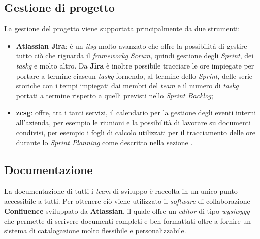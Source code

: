 \newpage

\subsection{Gestione di progetto}
    La gestione del progetto viene supportata principalmente da due strumenti:
    \begin{itemize}
        \item \textbf{Atlassian Jira}: è un \textit{\gls{itsg}} molto avanzato che offre la possibilità di gestire tutto ciò che riguarda il \textit{\gls{frameworkg}} \textit{Scrum}, quindi gestione degli \textit{Sprint}, dei \textit{\gls{taskg}} e molto altro. Da \textbf{Jira} è inoltre possibile tracciare le ore impiegate per portare a termine ciascun \textit{\gls{taskg}} fornendo, al termine dello \textit{Sprint}, delle serie storiche con i tempi impiegati dai membri del \textit{team} e il numero di \textit{\gls{taskg}} portati a termine rispetto a quelli previsti nello \textit{Sprint Backlog}; 
        \item \textbf{\gls{zcsg}}: offre, tra i tanti servizi, il calendario per la gestione degli eventi interni all'azienda, per esempio le riunioni e la possibilità di lavorare su documenti condivisi, per esempio i fogli di calcolo utilizzati per il tracciamento delle ore durante lo \textit{Sprint Planning} come descritto nella sezione . 
    \end{itemize}

\subsection{Documentazione}\label{sec:doc}
    La documentazione di tutti i \textit{team} di sviluppo è raccolta in un unico punto accessibile a tutti. Per ottenere ciò viene utilizzato il \textit{software} di collaborazione \textbf{Confluence} sviluppato da \textbf{Atlassian}, il quale offre un \textit{editor} di tipo \textit{\gls{wysiwygg}} che permette di scrivere documenti completi e ben formattati oltre a fornire un sistema di catalogazione molto flessibile e personalizzabile.

\newpage

